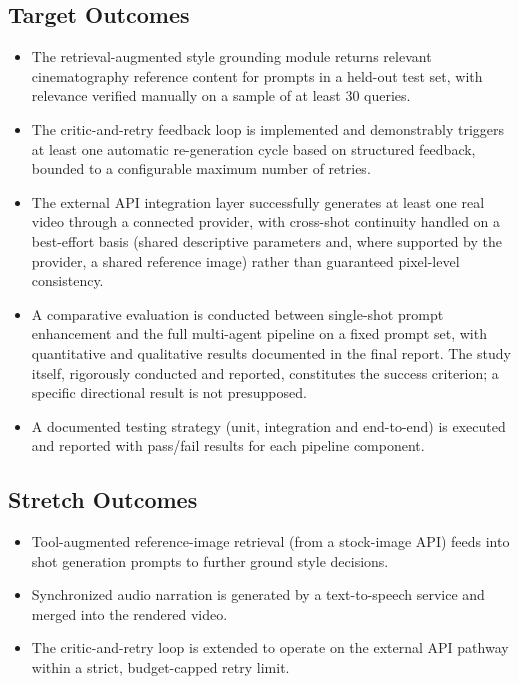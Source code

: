 \documentclass[11pt,a4paper]{article}
\begin{document}
\subsection*{Target Outcomes}
\begin{itemize}[leftmargin=*]
\item The retrieval-augmented style grounding module returns relevant cinematography reference content for prompts in a held-out test set, with relevance verified manually on a sample of at least 30 queries.
\item The critic-and-retry feedback loop is implemented and demonstrably triggers at least one automatic re-generation cycle based on structured feedback, bounded to a configurable maximum number of retries.
\item The external API integration layer successfully generates at least one real video through a connected provider, with cross-shot continuity handled on a best-effort basis (shared descriptive parameters and, where supported by the provider, a shared reference image) rather than guaranteed pixel-level consistency.
\item A comparative evaluation is conducted between single-shot prompt enhancement and the full multi-agent pipeline on a fixed prompt set, with quantitative and qualitative results documented in the final report. The study itself, rigorously conducted and reported, constitutes the success criterion; a specific directional result is not presupposed.
\item A documented testing strategy (unit, integration and end-to-end) is executed and reported with pass/fail results for each pipeline component.
\end{itemize}

\subsection*{Stretch Outcomes}
\begin{itemize}[leftmargin=*]
\item Tool-augmented reference-image retrieval (from a stock-image API) feeds into shot generation prompts to further ground style decisions.
\item Synchronized audio narration is generated by a text-to-speech service and merged into the rendered video.
\item The critic-and-retry loop is extended to operate on the external API pathway within a strict, budget-capped retry limit.
\end{itemize}
\end{document}

